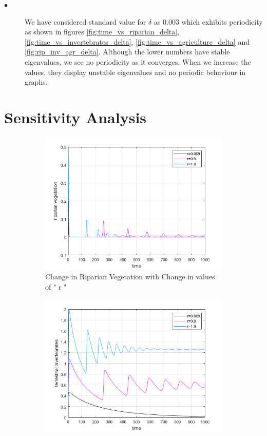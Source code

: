 \documentclass[12pt]{article}
\numberwithin{equation}{section}
\begin{document}
\begin{description}
\item[$\bullet$] We have considered standard value for $\delta$ as $0.003$ which exhibits periodicity as shown in figures \ref{fig:time_vs_riparian_delta}, \ref{fig:time_vs_invertebrates_delta}, \ref{fig:time_vs_agriculture_delta} and \ref{fig:rip_inv_agr_delta}. Although the lower numbers have stable eigenvalues, we see no periodicity as it converges. When we increase the values, they display unstable eigenvalues and no periodic behaviour in graphs.\\
\end{description}
\section{Sensitivity Analysis}

\begin{figure}[bp!]
	\centering
	\begin{subfigure}[t]{0.45\textwidth}
		\centering
	\includegraphics[width=\textwidth]{time_vs_riparian_r.png}
		\caption{Change in Riparian Vegetation with Change in values of " r "} \label{fig:time_vs_riparian_r}
	\end{subfigure}
\hspace{0.08\textwidth}
        \begin{subfigure}[t]{0.45\textwidth}
                 \centering
         \includegraphics[width=\textwidth]{time_vs_invertebrates_r.png}

\end{subfigure}
\end{figure}
\end{document}

